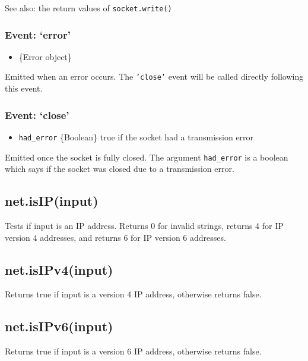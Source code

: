 See also: the return values of \texttt{socket.write()}

\subsubsection{Event: `error'}

\begin{itemize}
\item
  \{Error object\}
\end{itemize}

Emitted when an error occurs. The \texttt{'close'} event will be called
directly following this event.

\subsubsection{Event: `close'}

\begin{itemize}
\item
  \texttt{had\_error} \{Boolean\} true if the socket had a transmission
  error
\end{itemize}

Emitted once the socket is fully closed. The argument
\texttt{had\_error} is a boolean which says if the socket was closed due
to a transmission error.

\subsection{net.isIP(input)}

Tests if input is an IP address. Returns 0 for invalid strings, returns
4 for IP version 4 addresses, and returns 6 for IP version 6 addresses.

\subsection{net.isIPv4(input)}

Returns true if input is a version 4 IP address, otherwise returns
false.

\subsection{net.isIPv6(input)}

Returns true if input is a version 6 IP address, otherwise returns
false.

